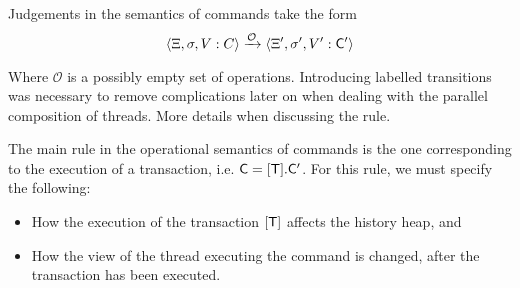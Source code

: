 \documentclass[a4paper,UKenglish]{article}%
\theoremstyle{plain}
\begin{document}
Judgements in the semantics of commands take the form 
\[ 
\langle \Xi, \sigma, V: C \rangle \xrightarrow{\mathcal{O}} \langle \Xi', \sigma', V': \mathsf{C}' \rangle
\]

Where $\mathcal{O}$ is a possibly empty set of operations.
\ac{Introducing labelled transitions was necessary to remove complications later on when dealing 
with the parallel composition of threads. More details when discussing the rule.}

The main rule in the operational semantics of commands is the one corresponding 
to the execution of a transaction, i.e. $\mathsf{C} = [\mathsf{T}].\mathsf{C}'$. For this rule, we must specify the following: 
\begin{itemize}
\item How the execution of the transaction $[\mathsf{T}]$ affects the history heap, and 
\item How the view of the thread executing the command is changed, after the transaction 
has been executed. 
\end{itemize}
\end{document}
